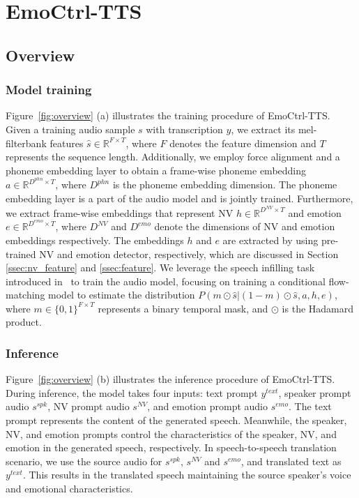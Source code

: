 
\vspace{-.5em}
\section{EmoCtrl-TTS}
\label{sec:method}

\vspace{-.5em}
\subsection{Overview}
\label{ssec: method overview}
\vspace{-.5em}

\subsubsection{Model training}
Figure~\ref{fig:overview} (a) illustrates the training procedure of EmoCtrl-TTS.
Given a training audio sample $s$ with transcription $y$, we extract its mel-filterbank features $\hat{s}\in\mathbb{R}^{F\times T}$, where $F$ denotes the feature dimension and $T$ represents the sequence length. 
Additionally, we employ force alignment and a phoneme embedding layer to obtain a frame-wise phoneme embedding $a \in\mathbb{R}^{D^{phn}\times T}$, where $D^{phn}$ is the phoneme embedding dimension. 
The phoneme embedding layer is a part of the audio model and is jointly trained.
Furthermore, we extract frame-wise embeddings that represent
NV  $h \in\mathbb{R}^{D^{NV}\times T}$ and emotion $e \in\mathbb{R}^{D^{emo}\times T}$,
where $D^{NV}$ and $D^{emo}$ denote the dimensions of NV and emotion embeddings respectively.
The embeddings $h$ and $e$ are extracted by using pre-trained NV and emotion detector,
respectively, which are discussed in Section \ref{ssec:nv_feature} and \ref{ssec:feature}.
We leverage the speech infilling task introduced in~\cite{le2024voicebox} to train the audio model, focusing on training a conditional flow-matching model to estimate the distribution $P(m\odot\hat{s}|(1-m)\odot\hat{s},a,h,e)$,
where $m\in\{0,1\}^{F\times T}$ represents a binary temporal mask, and $\odot$ 
is the Hadamard product.

\subsubsection{Inference}
Figure~\ref{fig:overview} (b) illustrates the inference procedure 
of EmoCtrl-TTS.
During inference, the model takes four inputs: 
text prompt $y^{text}$,
speaker prompt audio $s^{spk}$,
NV prompt audio $s^{NV}$, 
and emotion prompt audio $s^{emo}$.
The text prompt represents the content of the generated speech. Meanwhile, the speaker, 
NV, and emotion prompts control the characteristics of the speaker, NV, and emotion in the generated speech, respectively.
In speech-to-speech translation scenario, we use the source audio 
for $s^{spk}$, $s^{NV}$ and $s^{emo}$, and
translated text as $y^{text}$.
This results in the translated speech maintaining the source speaker’s voice and emotional characteristics.

